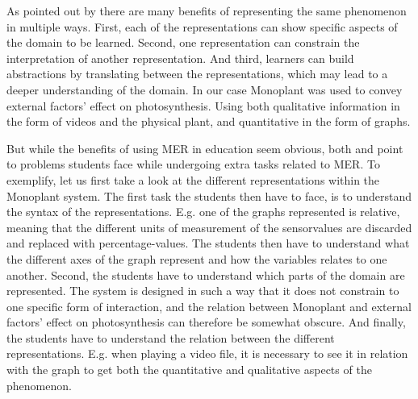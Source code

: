 As pointed out by \citet{van2006supporting} there are many benefits of representing the same phenomenon in multiple ways. First, each of the representations can show specific aspects of the domain to be learned. Second, one representation can constrain the interpretation of another representation. And third, learners can build abstractions by translating between the representations, which may lead to a deeper understanding of the domain. In our case Monoplant was used to convey external factors' effect on photosynthesis. Using both qualitative information in the form of videos and the physical plant, and quantitative in the form of graphs. 

But while the benefits of using MER in education seem obvious, both \citet{ainsworth1999functions} and \citet{van2006supporting} point to problems students face while undergoing extra tasks related to MER. To exemplify, let us first take a look at the different representations within the Monoplant system. The first task the students then have to face, is to understand the syntax of the representations. E.g. one of the graphs represented is relative, meaning that the different units of measurement of the sensorvalues are discarded and replaced with percentage-values. The students then have to understand what the different axes of the graph represent and how the variables relates to one another. Second, the students have to understand which parts of the domain are represented. The system is designed in such a way that it does not constrain to one specific form of interaction, and the relation between Monoplant and external factors' effect on photosynthesis can therefore be somewhat obscure. And finally, the students have to understand the relation between the different representations. E.g. when playing a video file, it is necessary to see it in relation with the graph to get both the quantitative and qualitative aspects of the phenomenon. 






